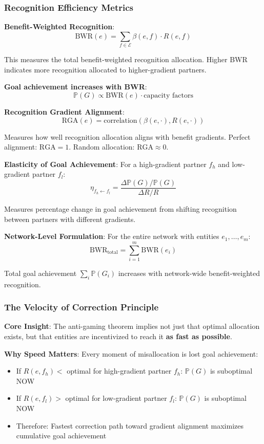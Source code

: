 \documentclass[11pt,a4paper]{article}
\theoremstyle{definition}
\theoremstyle{remark}
\newcommand{\E}{\mathcal{E}}
\begin{document}
\subsubsection{Recognition Efficiency Metrics}

\textbf{Benefit-Weighted Recognition}:
\[ \text{BWR}(e) = \sum_{f \in \E} \beta(e,f) \cdot R(e,f) \]

This measures the total benefit-weighted recognition allocation. Higher BWR indicates more recognition allocated to higher-gradient partners.

\textbf{Goal achievement increases with BWR}:
\[ \mathbb{P}(G) \propto \text{BWR}(e) \cdot \text{capacity factors} \]

\textbf{Recognition Gradient Alignment}:
\[ \text{RGA}(e) = \text{correlation}\left(\beta(e,\cdot), R(e,\cdot)\right) \]

Measures how well recognition allocation aligns with benefit gradients. Perfect alignment: $\text{RGA} = 1$. Random allocation: $\text{RGA} \approx 0$.

\textbf{Elasticity of Goal Achievement}:
For a high-gradient partner $f_h$ and low-gradient partner $f_l$:
\[ \eta_{f_h \leftarrow f_l} = \frac{\Delta\mathbb{P}(G) / \mathbb{P}(G)}{\Delta R / R} \]

Measures percentage change in goal achievement from shifting recognition between partners with different gradients.

\textbf{Network-Level Formulation}: For the entire network with entities $e_1, \dots, e_m$:
\[ \text{BWR}_{\text{total}} = \sum_{i=1}^m \text{BWR}(e_i) \]

Total goal achievement $\sum_i \mathbb{P}(G_i)$ increases with network-wide benefit-weighted recognition.

\subsubsection{The Velocity of Correction Principle}

\textbf{Core Insight}: The anti-gaming theorem implies not just that optimal allocation exists, but that entities are incentivized to reach it \textbf{as fast as possible}.

\textbf{Why Speed Matters}: Every moment of misallocation is lost goal achievement:
\begin{itemize}
\item If $R(e,f_h) <$ optimal for high-gradient partner $f_h$: $\mathbb{P}(G)$ is suboptimal NOW
\item If $R(e,f_l) >$ optimal for low-gradient partner $f_l$: $\mathbb{P}(G)$ is suboptimal NOW
\item Therefore: Fastest correction path toward gradient alignment maximizes cumulative goal achievement
\end{itemize}
\end{document}
